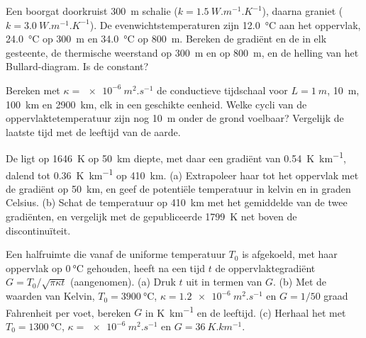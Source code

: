 \begin{exercise}[$\star\star$]\label{exo:b1:heat-budget:6}
Een boorgat doorkruist \qty{300}{m} schalie ($k = \qty{1.5}{W.m^{-1}.K^{-1}}$), daarna graniet ($k = \qty{3.0}{W.m^{-1}.K^{-1}}$). De evenwichtstemperaturen zijn \qty{12.0}{\degreeCelsius} aan het oppervlak, \qty{24.0}{\degreeCelsius} op \qty{300}{m} en \qty{34.0}{\degreeCelsius} op \qty{800}{m}. Bereken de gradiënt en de  in elk gesteente, de thermische weerstand op \qty{300}{m} en op \qty{800}{m}, en de helling van het Bullard-diagram. Is de  constant?
\end{exercise}

\begin{exercise}[$\star\star$]\label{exo:b1:heat-budget:7}
Bereken met $\kappa = \qty{e-6}{m^2.s^{-1}}$ de conductieve tijdschaal voor $L = \qty{1}{m}$, \qty{10}{m}, \qty{100}{km} en \qty{2900}{km}, elk in een geschikte eenheid. Welke cycli van de oppervlaktetemperatuur zijn nog \qty{10}{m} onder de grond voelbaar? Vergelijk de laatste tijd met de leeftijd van de aarde.
\end{exercise}

\begin{exercise}[$\star\star$]\label{exo:b1:heat-budget:8}
De  ligt op \qty{1646}{K} op \qty{50}{km} diepte, met daar een gradiënt van \qty{0.54}{K.km^{-1}}, dalend tot \qty{0.36}{K.km^{-1}} op \qty{410}{km}. (a) Extrapoleer haar tot het oppervlak met de gradiënt op \qty{50}{km}, en geef de potentiële temperatuur in kelvin en in graden Celsius. (b) Schat de temperatuur op \qty{410}{km} met het gemiddelde van de twee gradiënten, en vergelijk met de gepubliceerde \qty{1799}{K} net boven de discontinuïteit.
\end{exercise}

\begin{exercise}[$\star\star$]\label{exo:b1:heat-budget:9}
Een halfruimte die vanaf de uniforme temperatuur $T_0$ is afgekoeld, met haar oppervlak op $\qty{0}{\degreeCelsius}$ gehouden, heeft na een tijd $t$ de oppervlaktegradiënt $G =
T_0/\sqrt{\pi\kappa t}$ (aangenomen). (a) Druk $t$ uit in termen van $G$. (b) Met de waarden van Kelvin, $T_0 = \qty{3900}{\degreeCelsius}$, $\kappa =
\qty{1.2e-6}{m^2.s^{-1}}$ en $G = 1/50$ graad Fahrenheit per voet, bereken $G$ in \unit{K.km^{-1}} en de leeftijd. (c) Herhaal het met $T_0 =
\qty{1300}{\degreeCelsius}$, $\kappa = \qty{e-6}{m^2.s^{-1}}$ en $G =
\qty{36}{K.km^{-1}}$.
\end{exercise}

